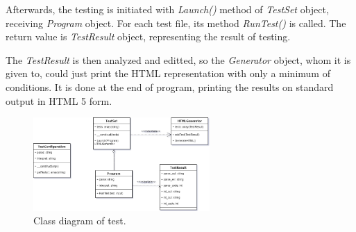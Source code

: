 \documentclass[10pt,a4paper,titlepage]{article}
\begin{document}
Afterwards, the testing is initiated with {\it Launch()} method of
{\it TestSet} object, receiving {\it Program} object. For each test file,
its method {\it RunTest()} is called. The return value is {\it TestResult}
object, representing the result of testing.

The {\it TestResult} is then analyzed and editted, so the {\it Generator}
object, whom it is given to, could just print the HTML representation with only
a minimum of conditions. It is done at the end of program, printing the
results on standard output in HTML 5 form.

\begin{figure}[h!]
    \begin{center}
        \includegraphics[width=0.6\textwidth]{test_classes.png}
        \caption{Class diagram of test. \label{fig:model}}
    \end{center}
\end{figure}
\end{document}
